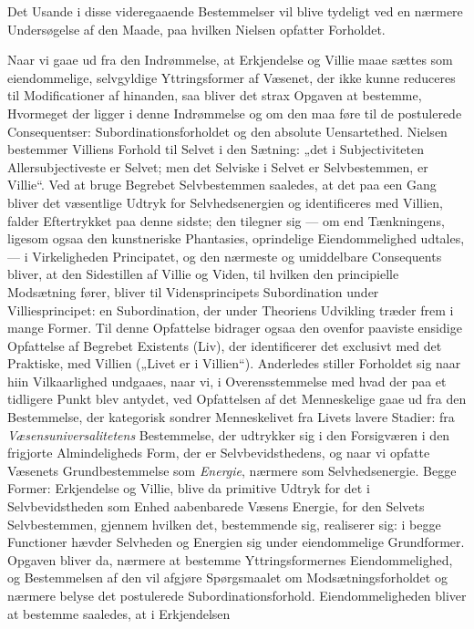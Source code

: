 \documentclass[12pt,a4paper]{book}
\newcommand{\opage}[1]{\marginnote{\footnotesize\textit{[#1]}}}
\begin{document}
Det Usande i disse videregaaende Bestemmelser vil blive tydeligt ved en
nærmere Undersøgelse af den Maade, paa hvilken Nielsen opfatter
Forholdet.

Naar vi gaae ud fra den Indrømmelse, at Erkjendelse og Villie maae
sættes som eiendommelige, selvgyldige Yttringsformer af Væsenet, der
ikke kunne reduceres til Modificationer af hinanden, saa bliver det
strax Opgaven at bestemme, Hvormeget der ligger i denne Indrømmelse og
om den maa føre til de postulerede Consequentser:
Subordinationsforholdet og den absolute Uensartethed. Nielsen bestemmer
Villiens Forhold til Selvet i den Sætning: „det i Subjectiviteten
Allersubjectiveste er Selvet; men det Selviske i Selvet er
Selvbestemmen, er Villie“. Ved at bruge Begrebet Selvbestemmen
saaledes, at det paa een Gang bliver det væsentlige Udtryk for
Selvhedsenergien og identificeres med Villien, falder Eftertrykket paa
denne sidste; den tilegner sig --- om end Tænkningens, ligesom ogsaa
den kunstneriske Phantasies, oprindelige Eiendommelighed udtales, --- i
Virkeligheden Principatet, og den nærmeste og umiddelbare Consequents
bliver, at den Sidestillen af Villie og Viden, til \opage{135}hvilken den
principielle Modsætning fører, bliver til Vidensprincipets
Subordination under Villiesprincipet: en Subordination, der under Theoriens
Udvikling træder frem i mange Former. Til denne Opfattelse bidrager ogsaa den ovenfor
paaviste ensidige
Opfattelse af Begrebet Existents (Liv), der identificerer det exclusivt
med det Praktiske, med Villien („Livet er i Villien“). Anderledes
stiller Forholdet sig naar hiin Vilkaarlighed undgaaes, naar vi, i
Overensstemmelse med hvad der paa et tidligere Punkt blev antydet, ved
Opfattelsen af det Menneskelige gaae ud fra den Bestemmelse, der
kategorisk sondrer Menneskelivet fra Livets lavere Stadier: fra \emph{Væsensuniversalitetens} Bestemmelse, der udtrykker sig i den
Forsigværen i den frigjorte Almindeligheds Form, der er
Selvbevidsthedens, og naar vi opfatte Væsenets Grundbestemmelse som
\emph{Energie}, nærmere som Selvhedsenergie. Begge Former: Erkjendelse og
Villie, blive da primitive Udtryk for det i Selvbevidstheden som Enhed
aabenbarede Væsens Energie, for den Selvets Selvbestemmen, gjennem
hvilken det, bestemmende sig, realiserer sig: i begge Functioner hævder
Selvheden og Energien sig under eiendommelige Grundformer. Opgaven
bliver da, nærmere at bestemme Yttringsformernes Eiendommelighed, og
Bestemmelsen af den vil afgjøre Spørgsmaalet om Modsætningsforholdet
og nærmere belyse det postulerede Subordinationsforhold.
Eiendommeligheden bliver at bestemme saaledes, at i Erkjendelsen
\end{document}
